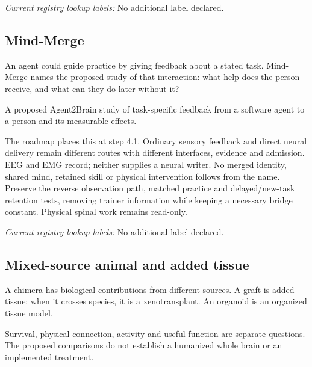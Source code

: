 \noindent\textit{Current registry lookup labels:} No additional label declared.\par

\subsection*{Mind-Merge}
\noindent An agent could guide practice by giving feedback about a stated task. Mind-Merge names the proposed study of that interaction: what help does the person receive, and what can they do later without it?\par
\noindent A proposed Agent2Brain study of task-specific feedback from a software agent to a person and its measurable effects.\par
\noindent The roadmap places this at step 4.1. Ordinary sensory feedback and direct neural delivery remain different routes with different interfaces, evidence and admission. EEG and EMG record; neither supplies a neural writer. No merged identity, shared mind, retained skill or physical intervention follows from the name. Preserve the reverse observation path, matched practice and delayed/new-task retention tests, removing trainer information while keeping a necessary bridge constant. Physical spinal work remains read-only.\par

\noindent\textit{Current registry lookup labels:} No additional label declared.\par

\begin{samepage}
\subsection*{Mixed-source animal and added tissue}
\noindent A chimera has biological contributions from different sources. A graft is added tissue; when it crosses species, it is a xenotransplant. An organoid is an organized tissue model.\par
\end{samepage}
\begin{samepage}
\noindent Survival, physical connection, activity and useful function are separate questions. The proposed comparisons do not establish a humanized whole brain or an implemented treatment.\par\nopagebreak[4]

\end{samepage}


